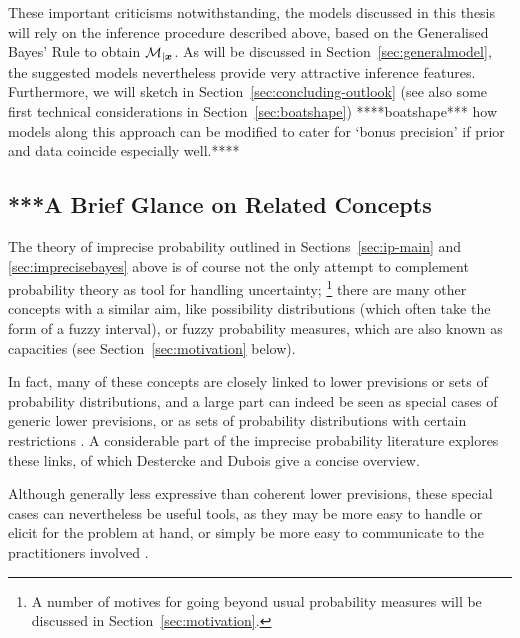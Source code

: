 These important criticisms notwithstanding, 
the models discussed in this thesis will rely on the inference procedure described above,
based on the Generalised Bayes' Rule to obtain $\mathcal{M}_{|{\bm x}}$.
As will be discussed in Section~\ref{sec:generalmodel},
the suggested models nevertheless provide very attractive inference features.
Furthermore, we will sketch in Section~\ref{sec:concluding-outlook}
(see also some first technical considerations in Section~\ref{sec:boatshape}) ****boatshape***
how models along this approach can be modified to cater for `bonus precision'
if prior and data coincide especially well.****


\subsection{***A Brief Glance on Related Concepts}
\label{sec:ip-related}


The theory of imprecise probability outlined in Sections~\ref{sec:ip-main} and \ref{sec:imprecisebayes} above
is of course not the only attempt to complement probability theory as tool for handling uncertainty;%
\footnote{A number of motives for going beyond usual probability measures will be discussed in Section~\ref{sec:motivation}.}
there are many other concepts with a similar aim,
like possibility distributions (which often take the form of a fuzzy interval),
or fuzzy probability measures, which are also known as capacities (see Section~\ref{sec:motivation} below).

In fact, many of these concepts are closely linked to
lower previsions or sets of probability distributions,
and a large part can indeed be seen as special cases of generic lower previsions, 
or as sets of probability distributions with certain restrictions
\parencite[Fig.~5.5]{itip-special}.
A considerable part of the imprecise probability literature
explores these links, of which Destercke and Dubois \parencite*{itip-other,itip-special}
give a concise overview.


Although generally less expressive than coherent lower previsions,
these special cases can nevertheless be useful tools,
as they may be more easy to handle or elicit for the problem at hand,
or simply be more easy to communicate to the practitioners involved
\parencite[\S 1]{itip-special}.

